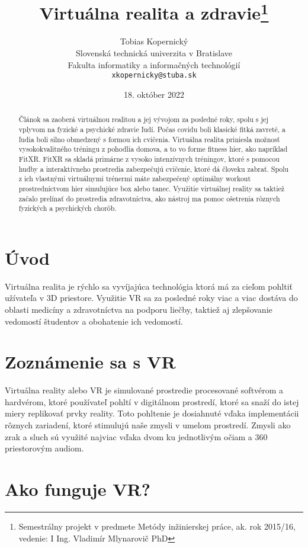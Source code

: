 \documentclass[10pt,twoside,slovak,a4paper]{article}
\title{Virtuálna realita a zdravie\thanks{Semestrálny projekt v predmete Metódy inžinierskej práce, ak. rok 2015/16, vedenie: I Ing. Vladimír Mlynarovič PhD}} %
\author{Tobias Kopernický\\[2pt]
	{\small Slovenská technická univerzita v Bratislave}\\
	{\small Fakulta informatiky a informačných technológií}\\
	{\small \texttt{xkopernicky@stuba.sk}}
	}
\date{\small 18. október 2022} %
\begin{document}
\maketitle

\begin{abstract}
Článok sa zaoberá virtuálnou realitou a jej vývojom za posledné roky, spolu s jej vplyvom na fyzické a psychické zdravie ľudí. Počas covidu boli klasické fitká zavreté, a ľudia boli silno obmedzený s formou ich cvičenia. Virtuálna realita priniesla možnosť vysokokvalitného tréningu z pohodlia domova, a to vo forme fitness hier, ako napríklad FitXR. FitXR sa skladá primárne z vysoko intenzívnych tréningov, ktoré s pomocou hudby a interaktívneho prostredia zabezpečujú cvičenie, ktoré dá človeku zabrať. Spolu z ich vlastnými virtuálnymi trénermi máte zabezpečený optimálny workout prostredníctvom hier simulujúce box alebo tanec. Využitie virtuálnej reality sa taktiež začalo prelínať do prostredia zdravotníctva, ako nástroj ma pomoc ošetrenia rôznych fyzických a psychických chorôb.
\end{abstract}


\section{Úvod}

Virtuálna realita je rýchlo sa vyvíjajúca technológia ktorá má za cieľom pohltiť užívateľa v 3D priestore. Využitie VR sa za posledné roky viac a viac dostáva do oblasti medicíny a zdravotníctva na podporu liečby, taktiež aj zlepšovanie vedomostí študentov a obohatenie ich vedomostí.



\section{Zoznámenie sa s VR} \label{Zoznamenie}

Virtuálna reality alebo VR je simulované prostredie procesované softvérom a hardvérom, ktoré používateľ pohltí v digitálnom prostredí, ktoré sa snaží do istej miery replikovať prvky reality. Toto pohltenie je dosiahnuté vďaka implementácii rôznych zariadení, ktoré stimulujú naše zmysli v umelom prostredí. Zmysli ako zrak a sluch sú využité najviac vďaka dvom ku jednotlivým očiam a 360 priestorovým audiom.

\section{Ako funguje VR?} \label{Funguje}
 
\end{document}
